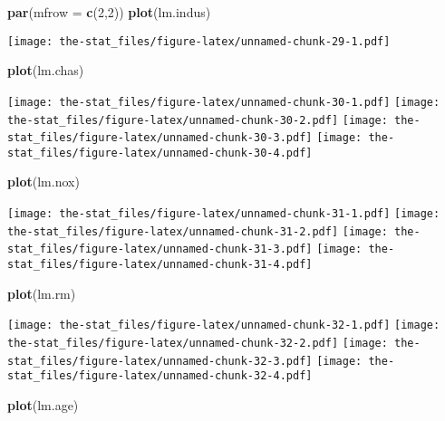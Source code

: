 \documentclass[
]{article}
\newenvironment{Shaded}{\begin{snugshade}}{\end{snugshade}}
\newcommand{\AttributeTok}[1]{\textcolor[rgb]{0.13,0.29,0.53}{#1}}
\newcommand{\DecValTok}[1]{\textcolor[rgb]{0.00,0.00,0.81}{#1}}
\newcommand{\FunctionTok}[1]{\textcolor[rgb]{0.13,0.29,0.53}{\textbf{#1}}}
\newcommand{\NormalTok}[1]{#1}
\begin{document}
\begin{Shaded}
\begin{Highlighting}[]
\FunctionTok{par}\NormalTok{(}\AttributeTok{mfrow =} \FunctionTok{c}\NormalTok{(}\DecValTok{2}\NormalTok{,}\DecValTok{2}\NormalTok{))}
\FunctionTok{plot}\NormalTok{(lm.indus)}
\end{Highlighting}
\end{Shaded}

\texttt{[image: the-stat\_files/figure-latex/unnamed-chunk-29-1.pdf]}

\begin{Shaded}
\begin{Highlighting}[]
\FunctionTok{plot}\NormalTok{(lm.chas)}
\end{Highlighting}
\end{Shaded}

\texttt{[image: the-stat\_files/figure-latex/unnamed-chunk-30-1.pdf]}
\texttt{[image: the-stat\_files/figure-latex/unnamed-chunk-30-2.pdf]}
\texttt{[image: the-stat\_files/figure-latex/unnamed-chunk-30-3.pdf]}
\texttt{[image: the-stat\_files/figure-latex/unnamed-chunk-30-4.pdf]}

\begin{Shaded}
\begin{Highlighting}[]
\FunctionTok{plot}\NormalTok{(lm.nox)}
\end{Highlighting}
\end{Shaded}

\texttt{[image: the-stat\_files/figure-latex/unnamed-chunk-31-1.pdf]}
\texttt{[image: the-stat\_files/figure-latex/unnamed-chunk-31-2.pdf]}
\texttt{[image: the-stat\_files/figure-latex/unnamed-chunk-31-3.pdf]}
\texttt{[image: the-stat\_files/figure-latex/unnamed-chunk-31-4.pdf]}

\begin{Shaded}
\begin{Highlighting}[]
\FunctionTok{plot}\NormalTok{(lm.rm)}
\end{Highlighting}
\end{Shaded}

\texttt{[image: the-stat\_files/figure-latex/unnamed-chunk-32-1.pdf]}
\texttt{[image: the-stat\_files/figure-latex/unnamed-chunk-32-2.pdf]}
\texttt{[image: the-stat\_files/figure-latex/unnamed-chunk-32-3.pdf]}
\texttt{[image: the-stat\_files/figure-latex/unnamed-chunk-32-4.pdf]}

\begin{Shaded}
\begin{Highlighting}[]
\FunctionTok{plot}\NormalTok{(lm.age)}
\end{Highlighting}
\end{Shaded}
\end{document}
